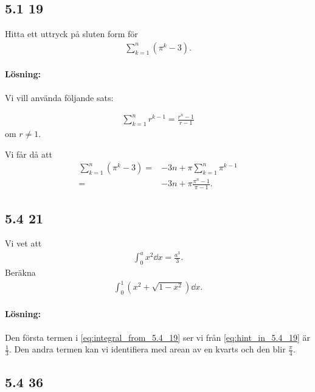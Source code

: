 
\subsection{5.1 19}%
\label{sub:5_1_19}

Hitta ett uttryck på sluten form för
\begin{align}
	\sum_{k = 1}^n (\pi^k - 3).
\end{align}

\paragraph{Lösning:}%
\label{par:losning_}

Vi vill använda följande sats:
\begin{theorem}[5.1 (d) i Adams]
	\begin{align}
		\sum_{k = 1}^n r^{k - 1} = \frac{r^n - 1}{r - 1}
	\end{align}
	om $r \neq 1$.
\end{theorem}
Vi får då att
\begin{align*}
	\sum_{k = 1}^n (\pi^k - 3) ={}& -3 n + \pi \sum_{k = 1}^n \pi^{k - 1}\\
	={}& -3 n + \pi \frac{\pi^n - 1}{\pi - 1}.
\end{align*}


\subsection{5.4 21}%
\label{sub:5_4_21}

Vi vet att
\begin{align}\label{eq:hint_in_5.4_19}
	\int_0^a x^2 \dd{x} = \frac{a^3}{3}.
\end{align}
Beräkna
\begin{align}\label{eq:integral_from_5.4_19}
	\int_0^1 (x^2 + \sqrt{1 - x^2}) \dd{x}.
\end{align}

\paragraph{Lösning:}

Den första termen i \cref{eq:integral_from_5.4_19} ser vi från \cref{eq:hint_in_5.4_19} är $\frac{1}{3}$.
Den andra termen kan vi identifiera med arean av en kvarts  och den blir $\frac{\pi}{4}$.


\subsection{5.4 36}%
\label{sub:5_4_36}

